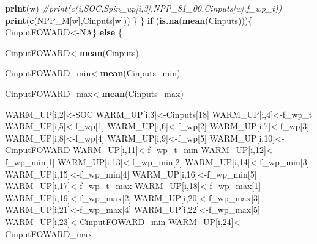 \documentclass[
  10pt,
  b5paper,
]{book}
\newenvironment{Shaded}{\begin{snugshade}}{\end{snugshade}}
\newcommand{\CommentTok}[1]{\textcolor[rgb]{0.56,0.35,0.01}{\textit{#1}}}
\newcommand{\ControlFlowTok}[1]{\textcolor[rgb]{0.13,0.29,0.53}{\textbf{#1}}}
\newcommand{\DecValTok}[1]{\textcolor[rgb]{0.00,0.00,0.81}{#1}}
\newcommand{\KeywordTok}[1]{\textcolor[rgb]{0.13,0.29,0.53}{\textbf{#1}}}
\newcommand{\NormalTok}[1]{#1}
\newcommand{\OtherTok}[1]{\textcolor[rgb]{0.56,0.35,0.01}{#1}}
\begin{document}
\begin{Shaded}
\begin{Highlighting}[]
{\KeywordTok{print}\NormalTok{(w)}
\CommentTok{#print(c(i,SOC,Spin_up[i,3],NPP_81_00,Cinputs[w],f_wp_t))}
\KeywordTok{print}\NormalTok{(}\KeywordTok{c}\NormalTok{(NPP_M[w],Cinputs[w]))}
\NormalTok{\}}
\NormalTok{\}}
\ControlFlowTok{if}\NormalTok{ (}\KeywordTok{is.na}\NormalTok{(}\KeywordTok{mean}\NormalTok{(Cinputs)))\{ CinputFOWARD<-}\OtherTok{NA}\NormalTok{\} }\ControlFlowTok{else}\NormalTok{ \{ }

\NormalTok{CinputFOWARD<-}\KeywordTok{mean}\NormalTok{(Cinputs)}

\NormalTok{CinputFOWARD_min<-}\KeywordTok{mean}\NormalTok{(Cinputs_min)}

\NormalTok{CinputFOWARD_max<-}\KeywordTok{mean}\NormalTok{(Cinputs_max)}

\NormalTok{WARM_UP[i,}\DecValTok{2}\NormalTok{]<-SOC}
\NormalTok{WARM_UP[i,}\DecValTok{3}\NormalTok{]<-Cinputs[}\DecValTok{18}\NormalTok{]}
\NormalTok{WARM_UP[i,}\DecValTok{4}\NormalTok{]<-f_wp_t}
\NormalTok{WARM_UP[i,}\DecValTok{5}\NormalTok{]<-f_wp[}\DecValTok{1}\NormalTok{]}
\NormalTok{WARM_UP[i,}\DecValTok{6}\NormalTok{]<-f_wp[}\DecValTok{2}\NormalTok{]}
\NormalTok{WARM_UP[i,}\DecValTok{7}\NormalTok{]<-f_wp[}\DecValTok{3}\NormalTok{]}
\NormalTok{WARM_UP[i,}\DecValTok{8}\NormalTok{]<-f_wp[}\DecValTok{4}\NormalTok{]}
\NormalTok{WARM_UP[i,}\DecValTok{9}\NormalTok{]<-f_wp[}\DecValTok{5}\NormalTok{]}
\NormalTok{WARM_UP[i,}\DecValTok{10}\NormalTok{]<-CinputFOWARD}
\NormalTok{WARM_UP[i,}\DecValTok{11}\NormalTok{]<-f_wp_t_min}
\NormalTok{WARM_UP[i,}\DecValTok{12}\NormalTok{]<-f_wp_min[}\DecValTok{1}\NormalTok{]}
\NormalTok{WARM_UP[i,}\DecValTok{13}\NormalTok{]<-f_wp_min[}\DecValTok{2}\NormalTok{]}
\NormalTok{WARM_UP[i,}\DecValTok{14}\NormalTok{]<-f_wp_min[}\DecValTok{3}\NormalTok{]}
\NormalTok{WARM_UP[i,}\DecValTok{15}\NormalTok{]<-f_wp_min[}\DecValTok{4}\NormalTok{]}
\NormalTok{WARM_UP[i,}\DecValTok{16}\NormalTok{]<-f_wp_min[}\DecValTok{5}\NormalTok{]}
\NormalTok{WARM_UP[i,}\DecValTok{17}\NormalTok{]<-f_wp_t_max}
\NormalTok{WARM_UP[i,}\DecValTok{18}\NormalTok{]<-f_wp_max[}\DecValTok{1}\NormalTok{]}
\NormalTok{WARM_UP[i,}\DecValTok{19}\NormalTok{]<-f_wp_max[}\DecValTok{2}\NormalTok{]}
\NormalTok{WARM_UP[i,}\DecValTok{20}\NormalTok{]<-f_wp_max[}\DecValTok{3}\NormalTok{]}
\NormalTok{WARM_UP[i,}\DecValTok{21}\NormalTok{]<-f_wp_max[}\DecValTok{4}\NormalTok{]}
\NormalTok{WARM_UP[i,}\DecValTok{22}\NormalTok{]<-f_wp_max[}\DecValTok{5}\NormalTok{]}
\NormalTok{WARM_UP[i,}\DecValTok{23}\NormalTok{]<-CinputFOWARD_min}
\NormalTok{WARM_UP[i,}\DecValTok{24}\NormalTok{]<-CinputFOWARD_max}

}
\end{Highlighting}
\end{Shaded}
\end{document}
